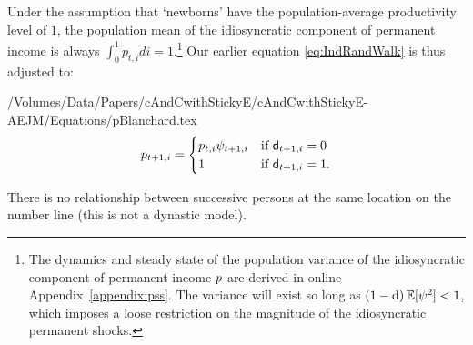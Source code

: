 Under the assumption that `newborns' have the population-average productivity level of $1$, the population mean of the idiosyncratic component of permanent income is always $\int_{0}^{1} {p}_{t,i}di = 1$.\footnote{The dynamics and steady state of the population variance of the idiosyncratic component of permanent income $p$ are derived in online Appendix~\ref{appendix:pss}.  The variance will exist so long as $(1-\mathrm{d}) \operatorname{\mathbb{E}}[\psi^{2}] < 1$, which imposes a loose restriction on the magnitude of the idiosyncratic permanent shocks.}  Our earlier equation \eqref{eq:IndRandWalk} is thus adjusted to:%
\begin{verbatimwrite}{/Volumes/Data/Papers/cAndCwithStickyE/cAndCwithStickyE-AEJM/Equations/pBlanchard.tex}
\begin{equation*}  
{p}_{t+1,i} =
  \begin{cases}
       {p}_{t,i} \psi_{t+1,i} & \text{if } \mathsf{d}_{t+1,i} = 0 \\
    1 & \text{if } \mathsf{d}_{t+1,i} = 1. \\
  \end{cases}
\end{equation*}
\end{verbatimwrite}

There is no relationship between successive persons at the same location on the number line (this is not a dynastic model).


